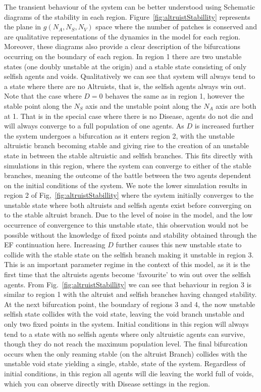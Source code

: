 \documentclass[11pt]{article}
\begin{document}
	The transient behaviour of the system can be better understood using Schematic diagrams of the stability in each region. Figure~\ref{fig:altruistStabillity} represents the plane in $g(N_A,N_S,N_V)$ space where the number of patches is conserved and are qualitative representations of the dynamics in the model for each region. Moreover, these diagrams also provide a clear description of the bifurcations occurring on the boundary of each region. In region 1 there are two unstable states (one doubly unstable at the origin) and a stable state consisting of only selfish agents and voids. Qualitatively we can see that system will always tend to a state where there are no Altruists, that is, the selfish agents always win out. Note that the case where $D=0$ behaves the same as in region 1, however the stable point along the $N_S$ axis and the unstable point along the $N_A$ axis are both at 1. That is in the special case where there is no Disease, agents do not die and will always converge to a full population of one agents. As $D$ is increased further the system undergoes a bifurcation as it enters region 2, with the unstable altruistic branch becoming stable and giving rise to the creation of an unstable state in between the stable altruistic and selfish branches. This fits directly with simulations in this region, where the system can converge to either of the stable branches, meaning the outcome of the battle between the two agents dependent on the initial conditions of the system. We note the lower simulation results in region 2 of Fig,~\ref{fig:altruistStabillity} where the system initially converges to the unstable state where both altruists and selfish agents exist before converging on to the stable altruist branch. Due to the level of noise in the model, and the low occurrence of convergence to this unstable state, this observation would not be possible without the knowledge of fixed points and stability obtained through the EF continuation here. Increasing $D$ further causes this new unstable state to collide with the stable state on the selfish branch making it unstable in region 3. This is an important parameter regime in the context of this model, as it is the first time that the altruists agents become `favourite' to win out over the selfish agents. From Fig.~\ref{fig:altruistStabillity} we can see that behaviour in region 3 is similar to region 1 with the altruist and selfish branches having changed stability. At the next bifurcation point, the boundary of regions 3 and 4, the now unstable selfish state collides with the void state, leaving the void branch unstable and only two fixed points in the system. Initial conditions in this region will always tend to a state with no selfish agents where only altruistic agents can survive, though they do not reach the maximum population level. The final bifurcation occurs when the only reaming stable (on the altruist Branch) collides with the unstable void state yielding a single, stable, state of the system. Regardless of initial conditions, in this region all agents will die leaving the world full of voids, which you can observe directly with Disease settings in the region. 
	
\end{document}
